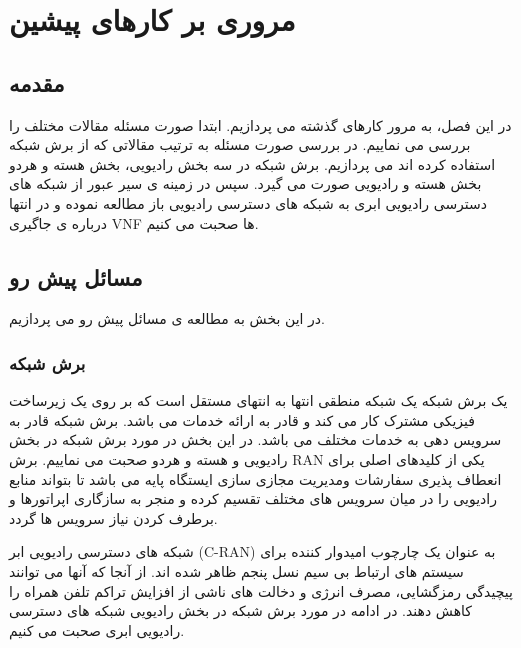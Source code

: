 \chapter{مروری بر کارهای پیشین}

\section{مقدمه}
در این فصل، به مرور کارهای گذشته می پردازیم.
ابتدا صورت مسئله مقالات مختلف را بررسی می نماییم.
در بررسی صورت مسئله به ترتیب مقالاتی که از برش شبکه استفاده کرده اند می پردازیم.
برش شبکه در سه بخش رادیویی، بخش هسته و هردو بخش هسته و رادیویی صورت می گیرد.
سپس در زمینه ی سیر عبور از شبکه های دسترسی رادیویی ابری به شبکه های دسترسی رادیویی باز مطالعه نموده و در انتها درباره ی جاگیری VNF ها صحبت می کنیم.
\section{مسائل پیش رو}
در این بخش به مطالعه ی مسائل پیش رو می پردازیم. 
\subsection{برش شبکه}
یک برش شبکه یک شبکه منطقی انتها به انتهای مستقل است که بر روی یک زیرساخت فیزیکی مشترک کار می کند و قادر به ارائه خدمات می باشد.
برش شبکه قادر به سرویس دهی به خدمات مختلف می باشد.
در این بخش در مورد برش شبکه در بخش رادیویی و هسته و هردو صحبت می نماییم.
برش RAN یکی از کلیدهای اصلی برای انعطاف پذیری سفارشات ومدیریت مجازی سازی ایستگاه پایه می باشد تا بتواند منابع رادیویی را در میان سرویس های مختلف تقسیم کرده و منجر به سازگاری اپراتورها و برطرف کردن نیاز سرویس ها گردد.

شبکه های دسترسی رادیویی ابر (C-RAN) به عنوان یک چارچوب امیدوار کننده برای سیستم های ارتباط بی سیم نسل پنجم ظاهر شده اند.
از آنجا که آنها می توانند پیچیدگی رمزگشایی، مصرف انرژی و دخالت های ناشی از افزایش تراکم تلفن همراه را کاهش دهند\cite{cranInt}.
در ادامه در مورد برش شبکه در بخش رادیویی شبکه های دسترسی رادیویی ابری صحبت می کنیم.

